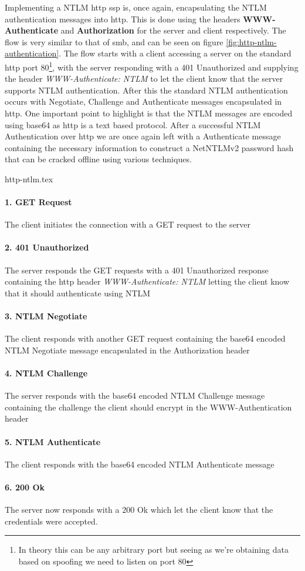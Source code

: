 \documentclass{article}
\begin{document}
\subsubsection{}
Implementing a NTLM \gls{http} \gls{ssp} is, once again, encapsulating the NTLM authentication messages into \gls{http}. This is done using the headers \textbf{WWW-Authenticate} and \textbf{Authorization} for the server and client respectively. The flow is very similar to that of \gls{smb}, and can be seen on figure \ref{fig:http-ntlm-authentication}. The flow starts with a client accessing a server on the standard http port 80\footnote{In theory this can be any arbitrary port but seeing as we're obtaining data based on spoofing we need to listen on port 80}, with the server responding with a 401 Unauthorized and supplying the header \emph{WWW-Authenticate: NTLM} to let the client know that the server supports NTLM authentication. After this the standard NTLM authentication occurs with Negotiate, Challenge and Authenticate messages encapsulated in \gls{http}. One important point to highlight is that the NTLM messages are encoded using base64 as \gls{http} is a text based protocol.
After a successful NTLM Authentication over \gls{http} we are once again left with a Authenticate message containing the necessary information to construct a NetNTLMv2 password hash that can be cracked offline using various techniques.

{http-ntlm.tex}
\paragraph{1. GET Request} The client initiates the connection with a GET request to the server
\paragraph{2. 401 Unauthorized} The server responds the GET requests with a 401 Unauthorized response containing the \gls{http} header \emph{WWW-Authenticate: NTLM} letting the client know that it should authenticate using NTLM
\paragraph{3. NTLM Negotiate} The client responds with another GET request containing the base64 encoded NTLM Negotiate message encapsulated in the Authorization header
\paragraph{4. NTLM Challenge} The server responds with the base64 encoded NTLM Challenge message containing the challenge the client should encrypt in the WWW-Authentication header
\paragraph{5. NTLM Authenticate} The client responds with the base64 encoded NTLM Authenticate message
\paragraph{6. 200 Ok} The server now responds with a 200 Ok which let the client know that the credentials were accepted.
\end{document}
